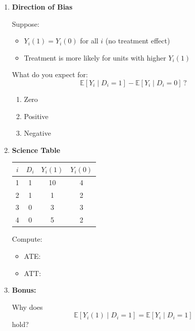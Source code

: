 \documentclass[12pt]{article}
\newcommand\E{\mathbb{E}}
\begin{document}
\begin{enumerate}
Consider:
\[
\E[Y_i \mid D_i = 1] - \E[Y_i \mid D_i = 0]
\]

Which is correct?

\begin{enumerate}[label=(\alph*)]
    \item Always equals ATE
    \item Always equals ATT
    \item Equals ATT plus selection bias
    \item Equals ATC
\end{enumerate}

\vspace{1cm}

\item \textbf{Direction of Bias}

Suppose:
\begin{itemize}
    \item $Y_i(1) = Y_i(0)$ for all $i$ (no treatment effect)
    \item Treatment is more likely for units with higher $Y_i(1)$
\end{itemize}

What do you expect for:
\[
\E[Y_i \mid D_i = 1] - \E[Y_i \mid D_i = 0] \, ?
\]

\begin{enumerate}[label=(\alph*)]
    \item Zero
    \item Positive
    \item Negative
\end{enumerate}

\vspace{1cm}

\item \textbf{Science Table}

\begin{center}
\begin{tabular}{c c c c}
$i$ & $D_i$ & $Y_i(1)$ & $Y_i(0)$ \\
\hline
1 & 1 & 10 & 4 \\
2 & 1 & 1 & 2 \\
3 & 0 & 3 & 3 \\
4 & 0 & 5 & 2 \\
\end{tabular}
\end{center}

Compute:

\begin{itemize}
    \item ATE:
    \vspace{0.5cm}
    \item ATT:
    \vspace{0.5cm}
\end{itemize}


\vspace{1cm}

\item \textbf{Bonus:}

Why does
\[
\E[Y_i(1)\mid D_i = 1] = \E[Y_i \mid D_i = 1]
\]
hold?

\vspace{1cm}

\end{enumerate}
\end{document}
